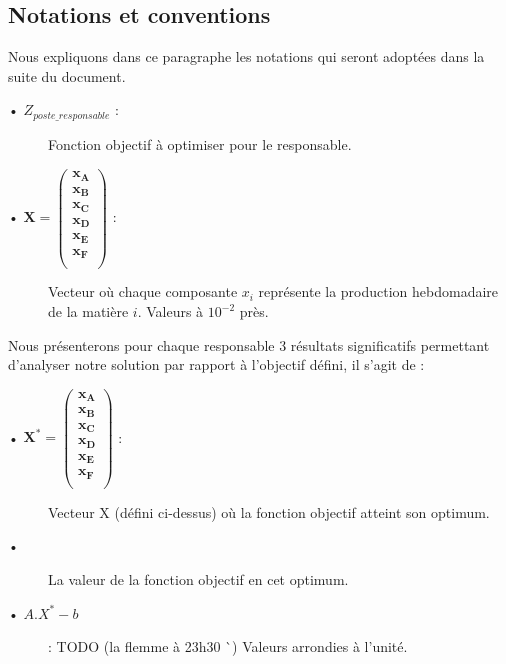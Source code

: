 \documentclass[12pt]{article}
\begin{document}
\subsection{Notations et conventions}
Nous expliquons dans ce paragraphe les notations qui seront adoptées dans la suite du document.
\begin{description}
\item[• $Z_{poste\_responsable}$ :] Fonction objectif à optimiser pour le responsable.
\item[• $\mathbf{X = 
   \left (
   \begin{array}{c}
      x_{A} \\
      x_{B} \\
      x_{C} \\
      x_{D} \\
      x_{E} \\
      x_{F} \\
   \end{array}
   \right )
 } $ :] Vecteur où chaque composante $x_{i}$ représente la production hebdomadaire de la matière $i$. Valeurs à $10^{-2}$ près.
\end{description}
Nous présenterons pour chaque responsable 3 résultats significatifs permettant d'analyser notre solution par rapport à l'objectif défini, il s'agit de :
\begin{description}

\item[• $\mathbf{X^{*} = 
   \left (
   \begin{array}{c}
      x_{A} \\
      x_{B} \\
      x_{C} \\
      x_{D} \\
      x_{E} \\
      x_{F} \\
   \end{array}
   \right )
 } $ :] Vecteur X (défini ci-dessus) où la fonction objectif atteint son optimum.
 \item[• ] La valeur de la fonction objectif en cet optimum.
 \item[• $A.X^{*}-b$] : TODO (la flemme à 23h30 ^^ ) Valeurs arrondies à l'unité.
 
\end{description}
\end{document}
